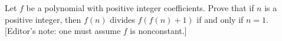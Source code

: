 Let $f$ be a polynomial with positive integer coefficients. Prove
that if $n$ is a positive integer, then $f(n)$ divides $f(f(n)+1)$ if
and only if $n=1$. [Editor's note: one must assume $f$ is nonconstant.]
